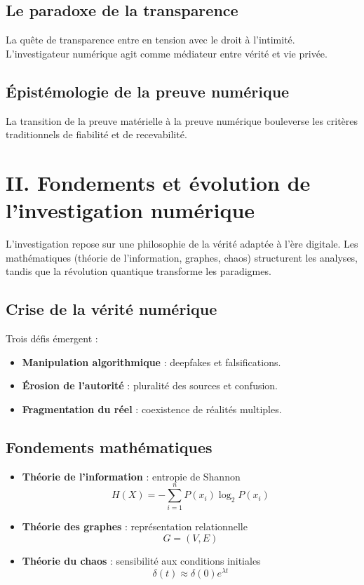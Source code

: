 \documentclass[12pt,a4paper]{article}
\begin{document}
\subsection{Le paradoxe de la transparence}
La quête de transparence entre en tension avec le droit à l’intimité. 
L’investigateur numérique agit comme médiateur entre vérité et vie privée.

\subsection{Épistémologie de la preuve numérique}
La transition de la preuve matérielle à la preuve numérique bouleverse les critères 
traditionnels de fiabilité et de recevabilité.

\section{II. Fondements et évolution de l’investigation numérique}
L’investigation repose sur une philosophie de la vérité adaptée à l’ère digitale. 
Les mathématiques (théorie de l’information, graphes, chaos) structurent les analyses, 
tandis que la révolution quantique transforme les paradigmes.

\subsection{Crise de la vérité numérique}
Trois défis émergent :
\begin{itemize}
\item \textbf{Manipulation algorithmique} : deepfakes et falsifications.
\item \textbf{Érosion de l’autorité} : pluralité des sources et confusion.
\item \textbf{Fragmentation du réel} : coexistence de réalités multiples.
\end{itemize}

\subsection{Fondements mathématiques}
\begin{itemize}
\item \textbf{Théorie de l’information} : entropie de Shannon
\[ H(X) = -\sum_{i=1}^{n} P(x_i) \log_2 P(x_i) \]
\item \textbf{Théorie des graphes} : représentation relationnelle
\[ G = (V, E) \]
\item \textbf{Théorie du chaos} : sensibilité aux conditions initiales
\[ \delta(t) \approx \delta(0)e^{\lambda t} \]
\end{itemize}
\end{document}
